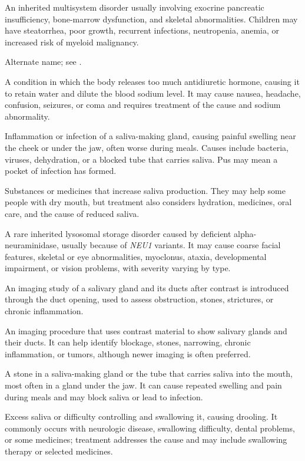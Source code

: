  An inherited multisystem disorder usually involving exocrine pancreatic insufficiency,
bone-marrow dysfunction, and skeletal abnormalities. Children may have steatorrhea, poor
growth, recurrent infections, neutropenia, anemia, or increased risk of myeloid
malignancy.

 Alternate name; see .

 A condition in which the body releases too much antidiuretic hormone, causing it to retain water and dilute the blood sodium level. It may cause nausea, headache, confusion, seizures, or coma and requires treatment of the cause and sodium abnormality.

 Inflammation or infection of a saliva-making gland, causing painful swelling near the cheek or under the jaw, often worse during meals. Causes include bacteria, viruses, dehydration, or a blocked tube that carries saliva. Pus may mean a pocket of infection has formed.

 Substances or medicines that increase saliva production. They may help some people with dry mouth, but treatment also considers hydration, medicines, oral care, and the cause of reduced saliva.

 A rare inherited lysosomal storage disorder caused by deficient alpha-neuraminidase, usually because of \textit{NEU1} variants. It may cause coarse facial features, skeletal or eye abnormalities, myoclonus, ataxia, developmental impairment, or vision problems, with severity varying by type.

 An imaging study of a salivary gland and its ducts after contrast is introduced through the duct opening, used to assess obstruction, stones, strictures, or chronic inflammation.

 An imaging procedure that uses contrast material to show salivary glands and their ducts. It can help identify blockage, stones, narrowing, chronic inflammation, or tumors, although newer imaging is often preferred.

 A stone in a saliva-making gland or the tube that carries saliva into the mouth, most often in a gland under the jaw. It can cause repeated swelling and pain during meals and may block saliva or lead to infection.

 Excess saliva or difficulty controlling and swallowing it, causing drooling. It commonly occurs with neurologic disease, swallowing difficulty, dental problems, or some medicines; treatment addresses the cause and may include swallowing therapy or selected medicines.


